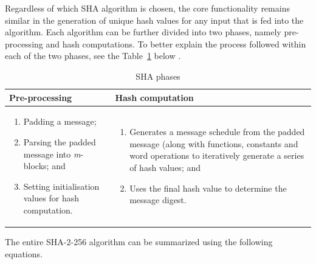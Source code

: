     Regardless of which SHA algorithm is chosen, the core functionality remains similar in the generation of unique hash values for any input that is fed into the algorithm. Each algorithm can be further divided into two phases, namely pre-processing and hash computations. To better explain the process followed within each of the two phases, see the Table~\ref{table: SHA phases} below \citep{Foti2015}.
    
    
    \begin{table}[h]
        \caption{SHA phases}
        \begin{tabular}{|p{} | p{}|}
          \hline
         \textbf{Pre-processing} & \textbf{Hash computation} \\
         \hline\hline
            \begin{enumerate}
                \item Padding a message;
                \item Parsing the padded message into \textit{m}-blocks; and
                \item Setting initialisation values for hash computation.
            \end{enumerate}
             & 
             \begin{enumerate}
                 \item Generates a message schedule from the padded message (along with functions, constants and word operations to iteratively generate a series of hash values; and
                 \item Uses the final hash value to determine the message digest.
             \end{enumerate} \\
             \hline
        \end{tabular}
        \label{table: SHA phases}
    \end{table}
    
    The entire SHA-2-256 algorithm can be summarized using the following equations.
    
    

